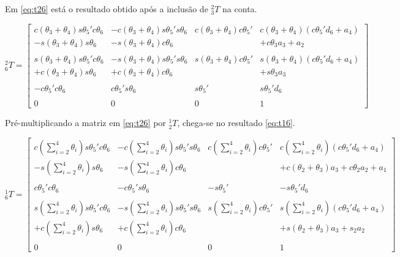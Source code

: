Em \ref{eq:t26} está o resultado obtido após a inclusão de $^2_3T$ na conta.

\begin{equation}
    \label{eq:t26}
    ^2_6T = \begin{bmatrix}
        c(\theta_3+\theta_4)s\theta_5'c\theta_6 & -c(\theta_3+\theta_4)s\theta_5's\theta_6  & c(\theta_3+\theta_4)c\theta_5' & c(\theta_3+\theta_4)(c\theta_5'd_6 + a_4) \\
        -s(\theta_3+\theta_4)s\theta_6          & -s(\theta_3+\theta_4)c\theta_6            &                                & +c\theta_3a_3 + a_2\\
        \\
        s(\theta_3+\theta_4)s\theta_5'c\theta_6 & -s(\theta_3+\theta_4)s\theta_5's\theta_6  & s(\theta_3+\theta_4)c\theta_5' & s(\theta_3+\theta_4)(c\theta_5'd_6 + a_4) \\
        +c(\theta_3+\theta_4)s\theta_6          & +c(\theta_3+\theta_4)c\theta_6            &                                & +s\theta_3a_3 \\
        \\
        -c\theta_5'c\theta_6                    & c\theta_5's\theta_6                       & s\theta_5'                     & s\theta_5'd_6 \\
        \\
        0 & 0 & 0 & 1
    \end{bmatrix}
\end{equation}

Pré-multiplicando a matriz em \ref{eq:t26} por $^1_2T$, chega-se no resultado \ref{eq:t16}.

\begin{equation}
    \label{eq:t16}
    ^1_6T = \begin{bmatrix}
        c(\sum\limits_{i=2}^4\theta_i)s\theta_5'c\theta_6 & -c(\sum\limits_{i=2}^4\theta_i)s\theta_5's\theta_6 & c(\sum\limits_{i=2}^4\theta_i)c\theta_5' & c(\sum\limits_{i=2}^4\theta_i)(c\theta_5'd_6 + a_4) \\
        -s(\sum\limits_{i=2}^4\theta_i)s\theta_6          & -s(\sum\limits_{i=2}^4\theta_i)c\theta_6           &                                         & +c(\theta_2+\theta_3)a_3 + c\theta_2a_2 + a_1\\
        \\
        c\theta_5'c\theta_6                              & -c\theta_5's\theta_6                              & -s\theta_5'                             & -s\theta_5'd_6 \\
        \\
        s(\sum\limits_{i=2}^4\theta_i)s\theta_5'c\theta_6 & -s(\sum\limits_{i=2}^4\theta_i)s\theta_5's\theta_6 & s(\sum\limits_{i=2}^4\theta_i)c\theta_5' & s(\sum\limits_{i=2}^4\theta_i)(c\theta_5'd_6 + a_4) \\
        +c(\sum\limits_{i=2}^4\theta_i)s\theta_6          & +c(\sum\limits_{i=2}^4\theta_i)c\theta_6           &                                         & +s(\theta_2+\theta_3)a_3 + s_2a_2 \\
        \\
        0 & 0 & 0 & 1
    \end{bmatrix}
\end{equation}

